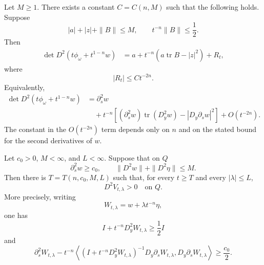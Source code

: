 \documentclass[10pt,a4paper]{amsart}
\newcommand{\tr}{\operatorname{tr}}
\begin{document}
\begin{lemma}\label{lem:det-first-order}
Let \(M\ge1\).  There exists a constant \(C=C(n,M)\) such that the following holds.  Suppose
\[
    |a|+|z|+\|B\|\le M,
    \qquad
    t^{-n}\|B\|\le \frac12.
\]
Then
\begin{equation}\label{eq:det-first-order}
\begin{aligned}
    \det D^2(t\phi_\omega+t^{1-n}w)
    &=
    a
    +
    t^{-n}\left(a\tr B-|z|^2\right)
    +
    R_t,
\end{aligned}
\end{equation}
where
\begin{equation}\label{eq:det-remainder-bound}
    |R_t|\le C t^{-2n}.
\end{equation}
Equivalently,
\begin{equation}\label{eq:det-first-order-w}
\begin{aligned}
    \det D^2(t\phi_\omega+t^{1-n}w)
    &=
    \partial_s^2 w \\
    &\quad
    +
    t^{-n}\left[
        (\partial_s^2w)\tr(D_y^2w)
        -
        |D_y\partial_s w|^2
    \right]
    +O(t^{-2n}).
\end{aligned}
\end{equation}
The constant in the \(O(t^{-2n})\) term depends only on \(n\) and on the stated bound for the second derivatives of \(w\).
\end{lemma}

\begin{lemma}\label{lem:schur-convexity-criterion}
Let \(c_0>0\), \(M<\infty\), and \(L<\infty\).  Suppose that on \(Q\)
\begin{equation}\label{eq:convexity-hypotheses-general}
    \partial_s^2 w\ge c_0,
    \qquad
    \|D^2w\|+\|D^2\eta\|\le M .
\end{equation}
Then there is \(T=T(n,c_0,M,L)\) such that, for every \(t\ge T\) and every \(|\lambda|\le L\),
\[
    D^2V_{t,\lambda}>0
    \quad\text{on }Q.
\]
More precisely, writing
\[
    W_{t,\lambda}=w+\lambda t^{-n}\eta,
\]
one has
\begin{equation}\label{eq:convexity-transverse-block}
    I+t^{-n}D_y^2W_{t,\lambda}
    \ge \frac12 I
\end{equation}
and
\begin{equation}\label{eq:convexity-schur-lower}
    \partial_s^2W_{t,\lambda}
    -t^{-n}
    \left\langle
        (I+t^{-n}D_y^2W_{t,\lambda})^{-1}D_y\partial_sW_{t,\lambda},
        D_y\partial_sW_{t,\lambda}
    \right\rangle
    \ge \frac{c_0}{2} .
\end{equation}
\end{lemma}
\end{document}
